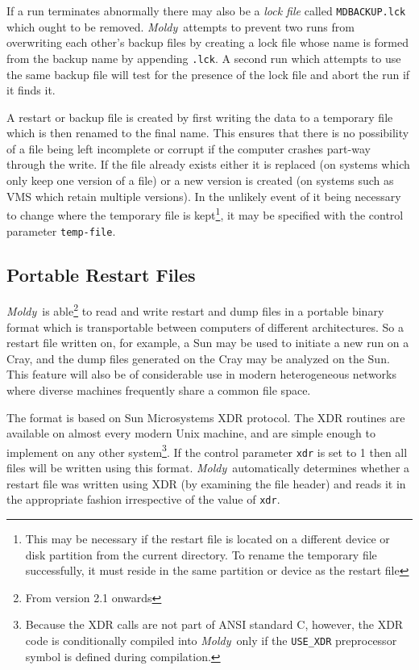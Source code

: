 \documentclass[twoside]{report}
\newcommand{\moldy}{{\em Moldy}}
\begin{document}
If a run terminates abnormally there may also be a {\em lock file\/}
called \texttt{MDBACKUP.lck} which ought to be removed.  \moldy\
attempts to prevent two runs from overwriting each other's backup
files by creating a lock file whose name is formed from the backup
name by appending \texttt{.lck}.  A second run which attempts to use the
same backup file will test for the presence of the lock file and abort
the run if it finds it.

A restart or backup file is created by first writing the data to a
temporary file which is then renamed to the final name.  This ensures
that there is no possibility of a file being left incomplete or
corrupt if the computer crashes part-way through the write.  If the
file already exists either it is replaced (on systems which only keep
one version of a file) or a new version is created (on systems such as
VMS which retain multiple versions).  In the unlikely event of
it being necessary to change where the temporary file is
kept\footnote{This may be necessary if the restart file is located on
a different device or disk partition from the current directory. To
rename the temporary file successfully, it must reside in the same
partition or device as the restart file}, it may be specified with the
control parameter
\texttt{temp-file}.

\subsection{Portable Restart Files}
\label{sec:xdr}
\moldy\ is able\footnote{From version 2.1 onwards} to read and write
restart and dump files in a portable binary format which is
transportable between computers of different architectures.  So a
restart file written on, for example, a Sun may be used to initiate a
new run on a Cray, and the dump files generated on the Cray may be
analyzed on the Sun.  This feature will also be of considerable use in
modern heterogeneous networks where diverse machines frequently share
a common file space.

The format is based on Sun Microsystems XDR protocol\cite{sunxdr}.
The XDR routines are available on almost every modern Unix machine,
and are simple enough to implement on any other
system\footnote{Because the XDR calls are not part of ANSI standard C,
however, the XDR code is conditionally compiled into \moldy\ only if
the \texttt{USE\_XDR} preprocessor symbol is defined during
compilation.}.  If the control parameter \texttt{xdr} is set to 1 then
all files will be written using this format. \moldy\ automatically
determines whether a restart file was written using XDR (by examining
the file header) and reads it in the appropriate fashion irrespective
of the value of \texttt{xdr}.
\end{document}

